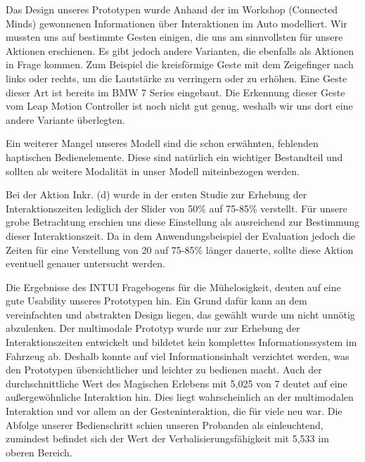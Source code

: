 Das Design unseres Prototypen wurde Anhand der im Workshop (Connected Minds) gewonnenen Informationen über Interaktionen im Auto modelliert. 
Wir mussten uns auf bestimmte Gesten einigen, die uns am sinnvollsten für unsere Aktionen erschienen. 
Es gibt jedoch andere Varianten, die ebenfalls als Aktionen in Frage kommen. 
Zum Beispiel die kreisförmige Geste mit dem Zeigefinger nach links oder rechts, um die Lautstärke zu verringern oder zu erhöhen. 
Eine Geste dieser Art ist bereits im BMW 7 Series eingebaut.
Die Erkennung dieser Geste vom Leap Motion Controller ist noch nicht gut genug, weshalb wir uns dort eine andere Variante überlegten.

Ein weiterer Mangel unseres Modell sind die schon erwähnten, fehlenden haptischen Bedienelemente. 
Diese sind natürlich ein wichtiger Bestandteil und sollten als weitere Modalität in unser Modell miteinbezogen werden. 

Bei der Aktion Inkr. (d) wurde in der ersten Studie zur Erhebung der Interaktionszeiten lediglich der Slider von 50\% auf 75-85\% verstellt.
Für unsere grobe Betrachtung erschien uns diese Einstellung als ausreichend zur Bestimmung dieser Interaktionszeit. 
Da in dem Anwendungsbeispiel der Evaluation jedoch die Zeiten für eine Verstellung von 20 auf 75-85\% länger dauerte, sollte diese Aktion eventuell genauer untersucht werden. 

Die Ergebnisse des INTUI Fragebogens für die Mühelosigkeit, deuten auf eine gute Usability unseres Prototypen hin. 
Ein Grund dafür kann an dem vereinfachten und abstrakten Design liegen, das gewählt wurde um nicht unnötig abzulenken.
Der multimodale Prototyp wurde nur zur Erhebung der Interaktionszeiten entwickelt und bildetet kein komplettes Informationssystem im Fahrzeug ab. 
Deshalb konnte auf viel Informationsinhalt verzichtet werden, was den Prototypen übersichtlicher und leichter zu bedienen macht.
Auch der durchschnittliche Wert des Magischen Erlebens mit 5,025 von 7 deutet auf eine außergewöhnliche Interaktion hin. 
Dies liegt wahrscheinlich an der multimodalen Interaktion und vor allem an der Gesteninteraktion, die für viele neu war. 
Die Abfolge unserer Bedienschritt schien unseren Probanden als einleuchtend, zumindest befindet sich der Wert der Verbalisierungsfähigkeit mit 5,533 im oberen Bereich.

